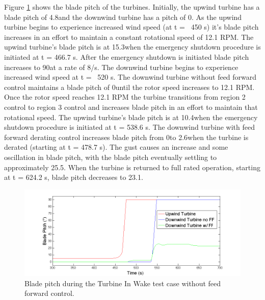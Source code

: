 Figure \ref{fig6-30} shows the blade pitch of the turbines. Initially, the upwind turbine has a blade pitch of 4.8\degree and the downwind turbine has a pitch of 0\degree. As the upwind turbine begins to experience increased wind speed (at t = ~450 s) it's blade pitch increases in an effort to maintain a constant rotational speed of 12.1 RPM. The upwind turbine's blade pitch is at 15.3\degree when the emergency shutdown procedure is initiated at t = 466.7 s. After the emergency shutdown is initiated blade pitch increases to 90\degree at a rate of 8\degree /s. The downwind turbine begins to experience increased wind speed at t = ~520 s. The downwind turbine without feed forward control maintains a blade pitch of 0\degree until the rotor speed increases to 12.1 RPM. Once the rotor speed reaches 12.1 RPM the turbine transitions from region 2 control to region 3 control and increases blade pitch in an effort to maintain that rotational speed. The upwind turbine's blade pitch is at 10.4\degree when the emergency shutdown procedure is initiated at t = 538.6 s. The downwind turbine with feed forward derating control increases blade pitch from 0\degree to 2.6\degree when the turbine is derated (starting at t = 478.7 s). The gust causes an increase and some oscillation in blade pitch, with the blade pitch eventually settling to approximately 25.5\degree. When the turbine is returned to full rated operation, starting at t = 624.2 s, blade pitch decreases to 23.1\degree.

\begin{figure}[ht] 
	\centering
		\includegraphics[width = \linewidth]{Figures/ch6Figures/fig6-30.png}

	\caption{Blade pitch during the Turbine In Wake test case without feed forward control.}
	\label{fig6-30}
\end{figure}

